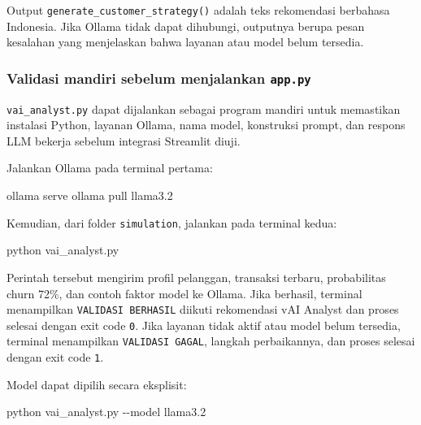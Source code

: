 \documentclass[
  indonesian,
  letterpaper,
  DIV=11,
  numbers=noendperiod]{scrreprt}
\newenvironment{Shaded}{\begin{snugshade}}{\end{snugshade}}
\newcommand{\AttributeTok}[1]{\textcolor[rgb]{0.40,0.45,0.13}{#1}}
\newcommand{\ExtensionTok}[1]{\textcolor[rgb]{0.00,0.23,0.31}{#1}}
\newcommand{\NormalTok}[1]{\textcolor[rgb]{0.00,0.23,0.31}{#1}}
\begin{document}
Output \texttt{generate\_customer\_strategy()} adalah teks rekomendasi
berbahasa Indonesia. Jika Ollama tidak dapat dihubungi, outputnya berupa
pesan kesalahan yang menjelaskan bahwa layanan atau model belum
tersedia.

\subsubsection{\texorpdfstring{Validasi mandiri sebelum menjalankan
\texttt{app.py}}{Validasi mandiri sebelum menjalankan app.py}}\label{validasi-mandiri-sebelum-menjalankan-app.py}

\texttt{vai\_analyst.py} dapat dijalankan sebagai program mandiri untuk
memastikan instalasi Python, layanan Ollama, nama model, konstruksi
prompt, dan respons LLM bekerja sebelum integrasi Streamlit diuji.

Jalankan Ollama pada terminal pertama:

\begin{Shaded}
\begin{Highlighting}[]
\ExtensionTok{ollama}\NormalTok{ serve}
\ExtensionTok{ollama}\NormalTok{ pull llama3.2}
\end{Highlighting}
\end{Shaded}

Kemudian, dari folder \texttt{simulation}, jalankan pada terminal kedua:

\begin{Shaded}
\begin{Highlighting}[]
\ExtensionTok{python}\NormalTok{ vai\_analyst.py}
\end{Highlighting}
\end{Shaded}

Perintah tersebut mengirim profil pelanggan, transaksi terbaru,
probabilitas churn 72\%, dan contoh faktor model ke Ollama. Jika
berhasil, terminal menampilkan \texttt{VALIDASI\ BERHASIL} diikuti
rekomendasi vAI Analyst dan proses selesai dengan exit code \texttt{0}.
Jika layanan tidak aktif atau model belum tersedia, terminal menampilkan
\texttt{VALIDASI\ GAGAL}, langkah perbaikannya, dan proses selesai
dengan exit code \texttt{1}.

Model dapat dipilih secara eksplisit:

\begin{Shaded}
\begin{Highlighting}[]
\ExtensionTok{python}\NormalTok{ vai\_analyst.py }\AttributeTok{{-}{-}model}\NormalTok{ llama3.2}
\end{Highlighting}
\end{Shaded}
\end{document}

